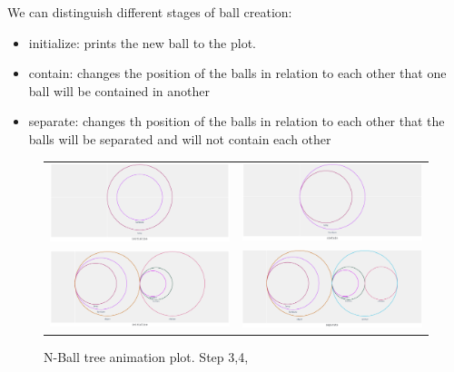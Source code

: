 \documentclass[]{article}
\begin{document}
We can distinguish different stages of ball creation:
\begin{itemize}
	\item initialize: prints the new ball to the plot.
	\item  contain: changes the position of the balls in relation to each other that one ball will be contained in another
	\item  separate: changes th position of the balls in relation to each other that the balls will be separated and will not contain each other
\end{itemize}

\begin{figure}[H]
	\begin{tabular}{cc}
	\includegraphics[width=55mm]{res/animation1.png} & \includegraphics[width=55mm]{res/animation2.png} \\
	\includegraphics[width=55mm]{res/animation3.png} & \includegraphics[width=55mm]{res/animation4.png} \\
	\end{tabular}
	\caption{N-Ball tree animation plot. Step 3,4, }
	\label{fig:animation}
\end{figure}
\end{document}
